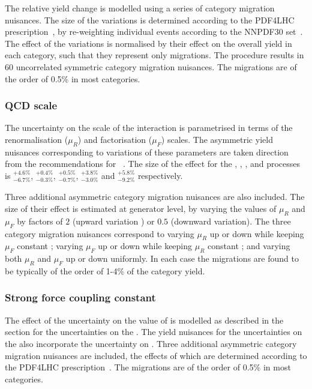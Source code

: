 The relative yield change is modelled using a series of category migration nuisances. The size of the variations is determined according to the PDF4LHC prescription~\cite{Demartin:2010er}, by re-weighting individual events according to the NNPDF30 \PDF set~\cite{Carrazza:2015aoa}. The effect of the variations is normalised by their effect on the overall yield in each category, such that they represent only migrations. The procedure results in 60 uncorrelated symmetric category migration nuisances. 
The migrations are of the order of 0.5\% in most categories.

\subsubsection{QCD scale}
The uncertainty on the scale of the \QCD interaction is parametrised in terms of the renormalisation ($\mu_{R}$) and factorisation ($\mu_{F}$) scales. The asymmetric yield nuisances corresponding to variations of these parameters are taken direction from the \LHCHXSWG recommendations for \crosssection\s~\cite{LHCHXSWGYR4}. The size of the effect for the \ggH, \VBF, \WH, \ZH and \ttH processes is $^{+4.6\%}_{-6.7\%}$, $^{+0.4\%}_{-0.3\%}$, $^{+0.5\%}_{-0.7\%}$, $^{+3.8\%}_{-3.0\%}$ and $^{+5.8\%}_{-9.2\%}$ respectively. 

Three additional asymmetric category migration nuisances are also included. The size of their effect is estimated at generator level, by varying the values of $\mu_{R}$ and $\mu_{F}$ by factors of $2$ (upward variation ) or $0.5$ (downward variation). The three category migration nuisances correspond to varying $\mu_{R}$ up or down while keeping $\mu_{F}$ constant ; varying $\mu_{F}$ up or down while keeping $\mu_{R}$ constant ; and varying both $\mu_{R}$ and $\mu_{F}$ up or down uniformly. In each case the migrations are found to be typically of the order of 1-4\% of the category yield.


\subsubsection{Strong force coupling constant}
The effect of the uncertainty on the value of \alphaS is modelled as described in the section for the uncertainties on the \PDF\s. The yield nuisances for the uncertainties on the \PDF\s also incorporate the uncertainty on \alphaS. Three additional asymmetric category migration nuisances are included, the effects of which are determined according to the PDF4LHC prescription~\cite{Demartin:2010er}.  
The migrations are of the order of 0.5\% in most categories.

